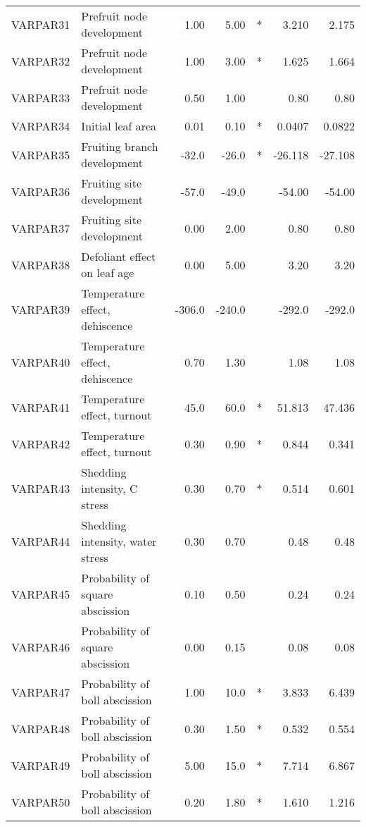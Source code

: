 \begin{longtable}{llrrcrr}
    VARPAR31 & Prefruit node development        & 1.00   & 5.00   & *   & 3.210   & 2.175   \\
    VARPAR32 & Prefruit node development        & 1.00   & 3.00   & *   & 1.625   & 1.664   \\
    VARPAR33 & Prefruit node development        & 0.50   & 1.00   &     & 0.80    & 0.80    \\
    VARPAR34 & Initial leaf area                & 0.01   & 0.10   & *   & 0.0407  & 0.0822  \\
    VARPAR35 & Fruiting branch development      & -32.0  & -26.0  & *   & -26.118 & -27.108 \\
    VARPAR36 & Fruiting site development        & -57.0  & -49.0  &     & -54.00  & -54.00  \\
    VARPAR37 & Fruiting site development        & 0.00   & 2.00   &     & 0.80    & 0.80    \\
    VARPAR38 & Defoliant effect on leaf age     & 0.00   & 5.00   &     & 3.20    & 3.20    \\
    VARPAR39 & Temperature effect, dehiscence   & -306.0 & -240.0 &     & -292.0  & -292.0  \\
    VARPAR40 & Temperature effect, dehiscence   & 0.70   & 1.30   &     & 1.08    & 1.08    \\
    VARPAR41 & Temperature effect, turnout      & 45.0   & 60.0   & *   & 51.813  & 47.436  \\
    VARPAR42 & Temperature effect, turnout      & 0.30   & 0.90   & *   & 0.844   & 0.341   \\
    VARPAR43 & Shedding intensity, C stress     & 0.30   & 0.70   & *   & 0.514   & 0.601   \\
    VARPAR44 & Shedding intensity, water stress & 0.30   & 0.70   &     & 0.48    & 0.48    \\
    VARPAR45 & Probability of square abscission & 0.10   & 0.50   &     & 0.24    & 0.24    \\
    VARPAR46 & Probability of square abscission & 0.00   & 0.15   &     & 0.08    & 0.08    \\
    VARPAR47 & Probability of boll abscission   & 1.00   & 10.0   & *   & 3.833   & 6.439   \\
    VARPAR48 & Probability of boll abscission   & 0.30   & 1.50   & *   & 0.532   & 0.554   \\
    VARPAR49 & Probability of boll abscission   & 5.00   & 15.0   & *   & 7.714   & 6.867   \\
    VARPAR50 & Probability of boll abscission   & 0.20   & 1.80   & *   & 1.610   & 1.216   \\

\end{longtable}

